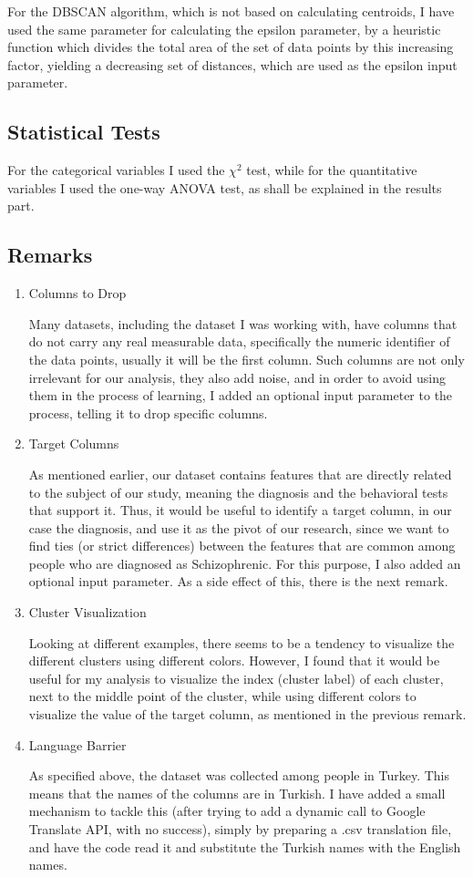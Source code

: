 \documentclass{article}
\begin{document}
For the DBSCAN algorithm, which is not based on calculating centroids, I have used the same parameter for calculating the epsilon parameter, by a heuristic function which divides the total area of the set of data points by this increasing factor, yielding a decreasing set of distances, which are used as the epsilon input parameter.

\subsection{Statistical Tests}
For the categorical variables I used the $\chi^2$ test, while for the quantitative variables I used the one-way ANOVA test, as shall be explained in the results part. 
\subsection{Remarks}
\begin{enumerate}
    \item Columns to Drop

    Many datasets, including the dataset I was working with, have columns that do not carry any real measurable data, specifically the numeric identifier of the data points, usually it will be the first column. Such columns are not only irrelevant for our analysis, they also add noise, and in order to avoid using them in the process of learning, I added an optional input parameter to the process, telling it to drop specific columns.
    \item Target Columns

    As mentioned earlier, our dataset contains features that are directly related to the subject of our study, meaning the diagnosis and the behavioral tests that support it. Thus, it would be useful to identify a target column, in our case the diagnosis, and use it as the pivot of our research, since we want to find ties (or strict differences) between the features that are common among people who are diagnosed as Schizophrenic. For this purpose, I also added an optional input parameter. As a side effect of this, there is the next remark.

    \item Cluster Visualization

    Looking at different examples, there seems to be a tendency to visualize the different clusters using different colors. However, I found that it would be useful for my analysis to visualize the index (cluster label) of each cluster, next to the middle point of the cluster, while using different colors to visualize the value of the target column, as mentioned in the previous remark.

    \item Language Barrier
    
    As specified above, the dataset was collected among people in Turkey. This means that the names of the columns are in Turkish. I have added a small mechanism to tackle this (after trying to add a dynamic call to Google Translate API, with no success), simply by preparing a .csv translation file, and have the code read it and substitute the Turkish names with the English names.
\end{enumerate}
\end{document}
